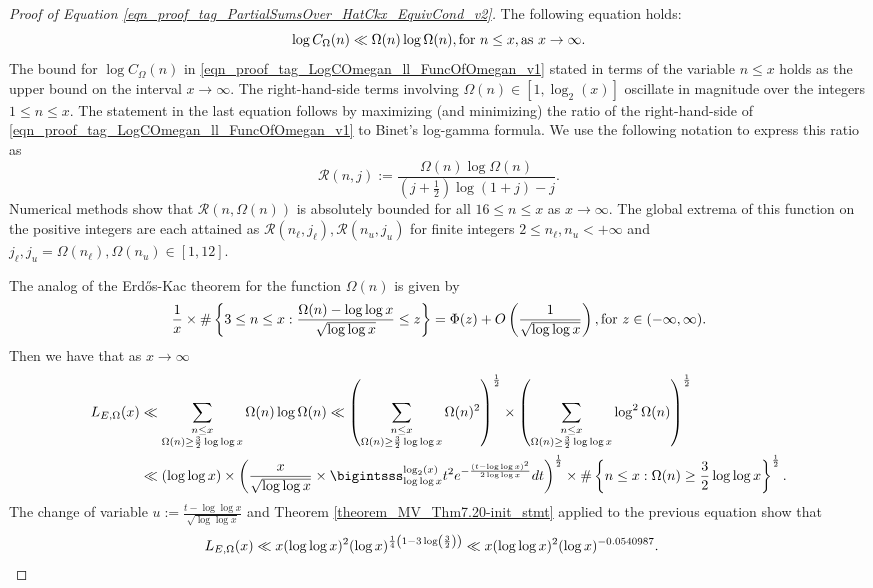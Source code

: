 \documentclass[11pt,reqno,a4letter]{article}
\newcommand{\hlocalref}[1]{\hyperref[#1]{\ref{#1}}}
\numberwithin{equation}{section}
\numberwithin{figure}{section}
\numberwithin{table}{section}
\theoremstyle{plain}
\numberwithin{theorem}{section}
\theoremstyle{definition}
\theoremstyle{remark}
\newcommand{\mathtext}[1]{\text{\rm #1}}
\begin{document}
\begin{proof}[Proof of Equation \eqref{eqn_proof_tag_PartialSumsOver_HatCkx_EquivCond_v2}]
The following equation holds:
\begin{equation}
\label{eqn_proof_tag_LogCOmegan_ll_FuncOfOmegan_v1}
\log C_{\Omega}(n) \ll \Omega(n) \log \Omega(n), \mathtext{ for } n \leq x, 
     \mathtext{ as } x \rightarrow \infty. 
\end{equation}
The bound for $\log C_{\Omega}(n)$ in 
\eqref{eqn_proof_tag_LogCOmegan_ll_FuncOfOmegan_v1} stated in terms of the variable 
$n \leq x$ holds as the upper bound on the interval $x \rightarrow \infty$. 
The right-hand-side terms involving $\Omega(n) \in [1, \log_2(x)]$ 
oscillate in magnitude over the integers $1 \leq n \leq x$. 
The statement in the last equation follows by 
maximizing (and minimizing) the ratio of the right-hand-side of 
\eqref{eqn_proof_tag_LogCOmegan_ll_FuncOfOmegan_v1} to 
Binet's log-gamma formula. 
We use the following notation to express this ratio as 
\[
\mathcal{R}(n, j) := \frac{\Omega(n) \log \Omega(n)}{\left(j + \frac{1}{2}\right) \log(1 + j) - j}. 
\]
Numerical methods show that $\mathcal{R}(n, \Omega(n))$ is absolutely bounded for all 
$16 \leq n \leq x$ as $x \rightarrow \infty$. 
The global extrema of this function on the positive integers 
are each attained as $\mathcal{R}(n_{\ell}, j_{\ell}), \mathcal{R}(n_{u}, j_{u})$ for 
finite integers $2 \leq n_{\ell}, n_u < +\infty$ and 
$j_{\ell},j_u = \Omega(n_{\ell}), \Omega(n_u) \in [1, 12]$. 

The analog of the Erd\H{o}s-Kac theorem for the function $\Omega(n)$ is given by 
\cite[Thm.~7.21; \S 7.4]{MV} 
\[
\frac{1}{x} \times \#\left\{3 \leq n \leq x: \frac{\Omega(n) - \log\log x}{\sqrt{\log\log x}} \leq z\right\} = 
     \Phi(z) + O\left(\frac{1}{\sqrt{\log\log x}}\right), \mathtext{ for } z \in (-\infty, \infty). 
\]
Then we have that as $x \rightarrow \infty$ 
\begin{align*}
L_{E,\Omega}(x) & \ll \sum_{\substack{n \leq x \\ \Omega(n) \geq \frac{3}{2} \log\log x}} 
	\Omega(n) \log \Omega(n) 
     \ll \left(\sum_{\substack{n \leq x \\ \Omega(n) \geq \frac{3}{2} \log\log x}} 
	\Omega(n)^2\right)^{\frac{1}{2}} \times 
     \left(\sum_{\substack{n \leq x \\ \Omega(n) \geq \frac{3}{2} \log\log x}} 
     \log^2 \Omega(n) \right)^{\frac{1}{2}} \\ 
     & \ll (\log\log x) \times 
	\left(\frac{x}{\sqrt{\log\log x}} \times \bigintsss_{\log\log x}^{\log_2(x)} t^2 
	e^{-\frac{\left(t-\log\log x\right)^2}{2\log\log x}} dt\right)^{\frac{1}{2}} \times 
     \#\left\{n \leq x: \Omega(n) \geq \frac{3}{2} \log\log x\right\}^{\frac{1}{2}}.
\end{align*} 
The change of variable $u := \frac{t-\log\log x}{\sqrt{\log\log x}}$ and 
Theorem \hlocalref{theorem_MV_Thm7.20-init_stmt} applied to the previous equation 
show that 
\begin{align*}
L_{E,\Omega}(x) & \ll 
     x (\log\log x)^2 (\log x)^{\frac{1}{4}\left(1 - 3\log\left(\frac{3}{2}\right)\right)} 
     \ll x (\log\log x)^2 (\log x)^{-0.0540987}. 
     \qedhere
\end{align*}
\end{proof} 
\end{document}
